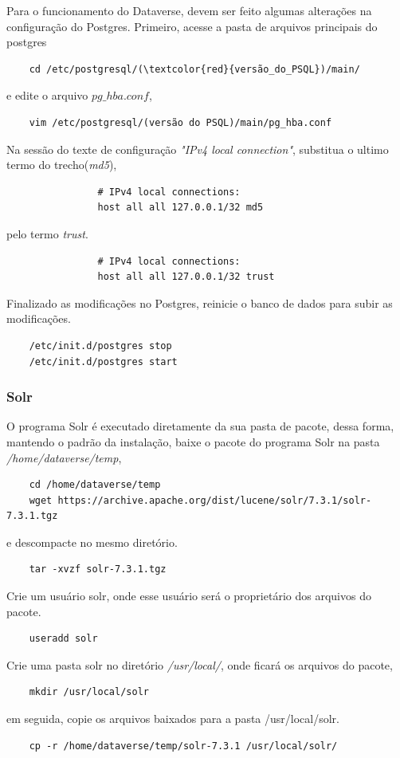 \documentclass[12pt,hidelinks]{article}
\begin{document}
        Para o funcionamento do Dataverse, devem ser feito algumas alterações na configuração do Postgres. Primeiro, acesse a pasta de arquivos principais do postgres
        \begin{verbatim} 
    cd /etc/postgresql/(\textcolor{red}{versão_do_PSQL})/main/
        \end{verbatim}
        e edite o arquivo $pg \_ hba.conf$,
         \begin{verbatim}
    vim /etc/postgresql/(versão do PSQL)/main/pg_hba.conf
        \end{verbatim}
        Na sessão do texte de configuração \textit{"IPv4 local connection"}, substitua o ultimo termo do trecho(\textit{md5}),
        \begin{verbatim} 
                # IPv4 local connections:
                host all all 127.0.0.1/32 md5
        \end{verbatim}
        pelo termo \textit{trust}.
        \begin{verbatim} 
                # IPv4 local connections:
                host all all 127.0.0.1/32 trust
        \end{verbatim}
        
        Finalizado as modificações no Postgres, reinicie o banco de dados para subir as modificações.
        \begin{verbatim}
    /etc/init.d/postgres stop
    /etc/init.d/postgres start
        \end{verbatim}
        
        \subsubsection{Solr}
        
        \qquad O programa Solr é executado diretamente da sua pasta de pacote, dessa forma, mantendo o padrão da instalação, baixe o pacote do programa Solr na pasta \textit{/home/dataverse/temp},
         \begin{verbatim}
    cd /home/dataverse/temp
    wget https://archive.apache.org/dist/lucene/solr/7.3.1/solr-7.3.1.tgz
        \end{verbatim}
        e descompacte no mesmo diretório.
       \begin{verbatim}
    tar -xvzf solr-7.3.1.tgz
        \end{verbatim}
        
        Crie um usuário solr, onde esse usuário será o proprietário dos arquivos do pacote.
        \begin{verbatim}
    useradd solr
        \end{verbatim}
        Crie uma pasta solr no diretório \textit{/usr/local/}, onde ficará os arquivos do pacote,
        \begin{verbatim}
    mkdir /usr/local/solr
        \end{verbatim}
        em seguida, copie os arquivos baixados para a pasta /usr/local/solr.
        \begin{verbatim}
    cp -r /home/dataverse/temp/solr-7.3.1 /usr/local/solr/
        \end{verbatim}
\end{document}
